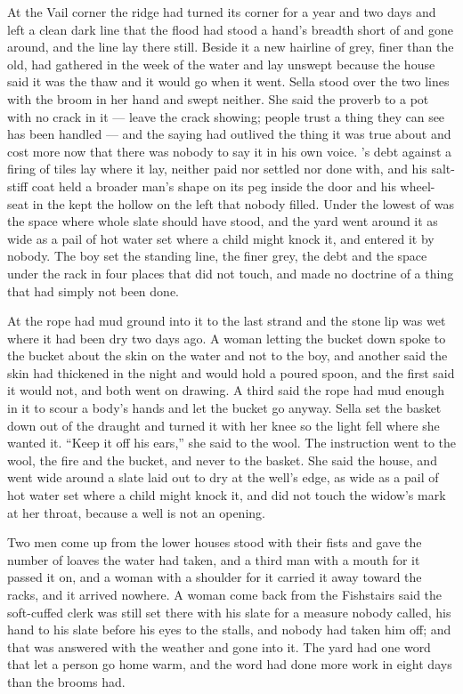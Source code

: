 At the Vail corner the  ridge had turned its corner for a year and two days and left a clean dark line that the flood had stood a hand's breadth short of and gone around, and the line lay there still. Beside it a new hairline of grey, finer than the old, had gathered in the week of the water and lay unswept because the house said it was the thaw and it would go when it went. Sella stood over the two lines with the broom in her hand and swept neither. She said the proverb to a pot with no crack in it --- leave the crack showing; people trust a thing they can see has been handled --- and the saying had outlived the thing it was true about and cost more now that there was nobody to say it in his own voice. 's debt against a firing of tiles lay where it lay, neither paid nor settled nor done with, and his salt-stiff coat held a broader man's shape on its peg inside the  door and his wheel-seat in the  kept the hollow on the left that nobody filled. Under the lowest of  was the space where whole slate should have stood, and the yard went around it as wide as a pail of hot water set where a child might knock it, and entered it by nobody. The boy set the standing line, the finer grey, the debt and the space under the rack in four places that did not touch, and made no doctrine of a thing that had simply not been done.

\scenebreak

At  the rope had mud ground into it to the last strand and the stone lip was wet where it had been dry two days ago. A woman letting the bucket down spoke to the bucket about the skin on the water and not to the boy, and another said the skin had thickened in the night and would hold a poured spoon, and the first said it would not, and both went on drawing. A third said the rope had mud enough in it to scour a body's hands and let the bucket go anyway. Sella set the basket down out of the draught and turned it with her knee so the light fell where she wanted it. “Keep it off his ears,” she said to the wool. The instruction went to the wool, the fire and the bucket, and never to the basket. She said the house, and went wide around a slate laid out to dry at the well's edge, as wide as a pail of hot water set where a child might knock it, and did not touch the widow's mark at her throat, because a well is not an opening.

Two men come up from the lower houses stood with their fists and gave the number of loaves the water had taken, and a third man with a mouth for it passed it on, and a woman with a shoulder for it carried it away toward the racks, and it arrived nowhere. A woman come back from the Fishstairs said the soft-cuffed clerk was still set there with his slate for a measure nobody called, his hand to his slate before his eyes to the stalls, and nobody had taken him off; and that was answered with the weather and gone into it. The yard had one word that let a person go home warm, and the word had done more work in eight days than the brooms had.

